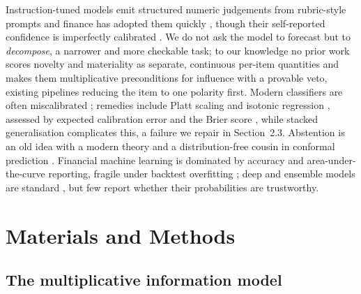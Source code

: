 \documentclass[12pt,a4paper]{article}
\begin{document}
Instruction-tuned models emit structured numeric judgements from rubric-style
prompts \cite{brown2020} and finance has adopted them quickly \cite{lopezlira2023},
though their self-reported confidence is imperfectly calibrated
\cite{steyvers2025}. We do not ask the model to forecast but to \emph{decompose}, a
narrower and more checkable task; to our knowledge no prior work scores novelty and
materiality as separate, continuous per-item quantities and makes them
multiplicative preconditions for influence with a provable veto, existing pipelines
\cite{loughran2011,lopezlira2023,ke2019,huang2023} reducing the item to one polarity
first. Modern classifiers are often miscalibrated \cite{guo2017}; remedies include
Platt scaling \cite{platt1999} and isotonic regression \cite{zadrozny2002}, assessed
by expected calibration error and the Brier score \cite{brier1950}, while stacked
generalisation \cite{wolpert1992} complicates this, a failure we repair in
Section~2.3. Abstention is an old idea \cite{chow1970} with a modern theory
\cite{geifman2017} and a distribution-free cousin in conformal prediction
\cite{angelopoulos2021}. Financial machine learning is dominated by accuracy and
area-under-the-curve reporting, fragile under backtest overfitting
\cite{bailey2017}; deep and ensemble models are standard \cite{gu2020}, but few
report whether their probabilities are trustworthy.

\section{Materials and Methods}

\subsection{The multiplicative information model}
\end{document}
